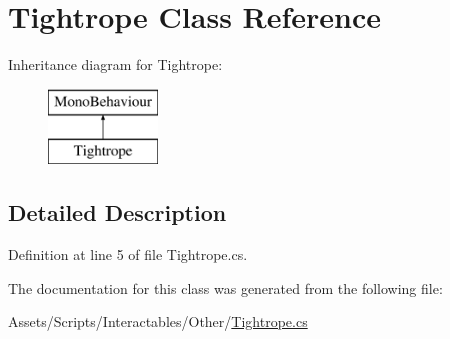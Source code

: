 \hypertarget{class_tightrope}{}\section{Tightrope Class Reference}
\label{class_tightrope}
Inheritance diagram for Tightrope\+:\begin{figure}[H]
\begin{center}
\leavevmode
\includegraphics[height=2.000000cm]{class_tightrope}
\end{center}
\end{figure}


\subsection{Detailed Description}


Definition at line 5 of file Tightrope.\+cs.



The documentation for this class was generated from the following file\+:\begin{DoxyCompactItemize}
\item 
Assets/\+Scripts/\+Interactables/\+Other/\mbox{\hyperlink{_tightrope_8cs}{Tightrope.\+cs}}\end{DoxyCompactItemize}
